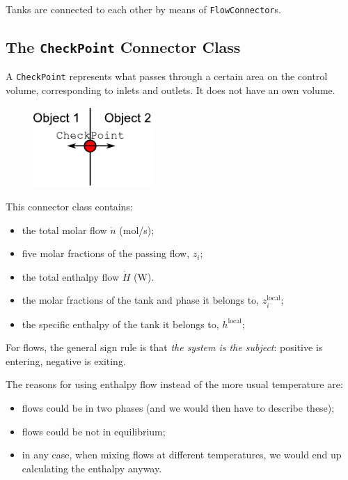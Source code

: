 \documentclass[a4paper]{article}
\begin{document}
Tanks are connected to each other by means of \texttt{FlowConnector}s.


\subsection{The \texttt{CheckPoint} Connector Class}
A \texttt{CheckPoint} represents what passes through a certain area on the
control volume, corresponding to inlets and outlets. It does not have an own
volume.

\begin{figure}[h]
\centering
\includegraphics[width=0.4\textwidth]{pics/checkpoint}
\end{figure}

This connector class contains:

\begin{itemize}
\item the total molar flow $\dot n$ (mol/s);
\item five molar fractions of the passing flow, $z_i$;
\item the total enthalpy flow $\dot H$ (W).
\item the molar fractions of the tank and phase it belongs to,
$z^\text{local}_i$;
\item the specific enthalpy of the tank it belongs to, $h^\text{local}$;
\end{itemize}

For flows, the general sign rule is that \emph{the system is the subject}:
positive is entering, negative is exiting.

The reasons for using enthalpy flow instead of the more usual temperature are:

\begin{itemize}
\item flows could be in two phases (and we would then have to describe these);
\item flows could be not in equilibrium;
\item in any case, when mixing flows at different temperatures, we would end up
calculating the enthalpy anyway.
\end{itemize}
\end{document}
